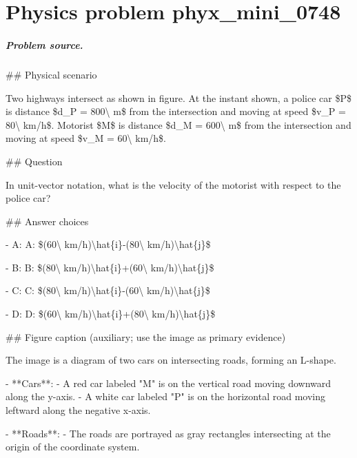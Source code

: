 
\chapter{Physics problem phyx\_mini\_0748}
\label{ch:PhyXMiniProblems_problem_phyx_mini_0748}

\paragraph{Problem source.}
\#\# Physical scenario

Two highways intersect as shown in figure. At the instant shown, a police car \$P\$ is distance \$d\_P = 800\textbackslash{} m\$ from the intersection and moving at speed \$v\_P = 80\textbackslash{} km/h\$. Motorist \$M\$ is distance \$d\_M = 600\textbackslash{} m\$ from the intersection and moving at speed \$v\_M = 60\textbackslash{} km/h\$.

\#\# Question

In unit-vector notation, what is the velocity of the motorist with respect to the police car?

\#\# Answer choices

- A: A: \$(60\textbackslash{} km/h)\textbackslash{}hat\{i\}-(80\textbackslash{} km/h)\textbackslash{}hat\{j\}\$

- B: B: \$(80\textbackslash{} km/h)\textbackslash{}hat\{i\}+(60\textbackslash{} km/h)\textbackslash{}hat\{j\}\$

- C: C: \$(80\textbackslash{} km/h)\textbackslash{}hat\{i\}-(60\textbackslash{} km/h)\textbackslash{}hat\{j\}\$

- D: D: \$(60\textbackslash{} km/h)\textbackslash{}hat\{i\}+(80\textbackslash{} km/h)\textbackslash{}hat\{j\}\$

\#\# Figure caption (auxiliary; use the image as primary evidence)

The image is a diagram of two cars on intersecting roads, forming an L-shape.

- **Cars**: 
  - A red car labeled "M" is on the vertical road moving downward along the y-axis.
  - A white car labeled "P" is on the horizontal road moving leftward along the negative x-axis.

- **Roads**: 
  - The roads are portrayed as gray rectangles intersecting at the origin of the coordinate system.

